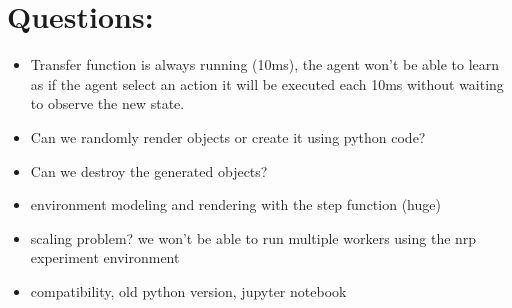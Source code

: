 \section{Questions:}

\begin{itemize}
    \item Transfer function is always running (10ms), the agent won't be able to learn as if the agent select an action it will be executed each 10ms without waiting to observe the new state.
    \item Can we randomly render objects or create it using python code?
    \item Can we destroy the generated objects?
    \item environment modeling and rendering with the step function (huge)
    \item scaling problem? we won't be able to run multiple workers using the nrp experiment environment
    \item compatibility, old python version, jupyter notebook
\end{itemize}


